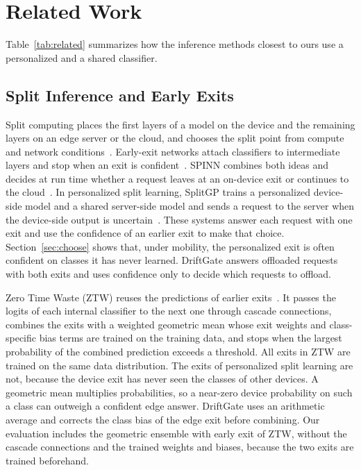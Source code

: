 \section{Related Work}
\label{sec:related}

Table~\ref{tab:related} summarizes how the inference methods closest to ours use a personalized and a shared classifier.

\subsection{Split Inference and Early Exits}

Split computing places the first layers of a model on the device and the remaining layers on an edge server or the cloud, and chooses the split point from compute and network conditions~\cite{kang2017neurosurgeon,mao2017mecsurvey}. Early-exit networks attach classifiers to intermediate layers and stop when an exit is confident~\cite{teerapittayanon2016branchynet,kaya2019shallowdeep}. SPINN combines both ideas and decides at run time whether a request leaves at an on-device exit or continues to the cloud~\cite{laskaridis2020spinn}. In personalized split learning, SplitGP trains a personalized device-side model and a shared server-side model and sends a request to the server when the device-side output is uncertain~\cite{han2023splitgp}. These systems answer each request with one exit and use the confidence of an earlier exit to make that choice. Section~\ref{sec:choose} shows that, under mobility, the personalized exit is often confident on classes it has never learned. DriftGate answers offloaded requests with both exits and uses confidence only to decide which requests to offload.

Zero Time Waste (ZTW) reuses the predictions of earlier exits~\cite{wolczyk2021ztw}. It passes the logits of each internal classifier to the next one through cascade connections, combines the exits with a weighted geometric mean whose exit weights and class-specific bias terms are trained on the training data, and stops when the largest probability of the combined prediction exceeds a threshold. All exits in ZTW are trained on the same data distribution. The exits of personalized split learning are not, because the device exit has never seen the classes of other devices. A geometric mean multiplies probabilities, so a near-zero device probability on such a class can outweigh a confident edge answer. DriftGate uses an arithmetic average and corrects the class bias of the edge exit before combining. Our evaluation includes the geometric ensemble with early exit of ZTW, without the cascade connections and the trained weights and biases, because the two exits are trained beforehand.

